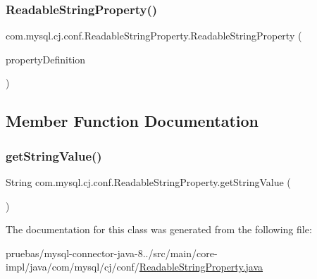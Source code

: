 \subsubsection{\texorpdfstring{Readable\+String\+Property()}{ReadableStringProperty()}}
{\footnotesize\ttfamily com.\+mysql.\+cj.\+conf.\+Readable\+String\+Property.\+Readable\+String\+Property (\begin{DoxyParamCaption}\item[{\mbox{\hyperlink{interfacecom_1_1mysql_1_1cj_1_1conf_1_1_property_definition}{Property\+Definition}}$<$ String $>$}]{property\+Definition }\end{DoxyParamCaption})\hspace{0.3cm}{\ttfamily [protected]}}



\subsection{Member Function Documentation}
\mbox{\label{classcom_1_1mysql_1_1cj_1_1conf_1_1_readable_string_property_a80f31bf0ff94266fcec3d38571797c65}} 
\subsubsection{\texorpdfstring{get\+String\+Value()}{getStringValue()}}
{\footnotesize\ttfamily String com.\+mysql.\+cj.\+conf.\+Readable\+String\+Property.\+get\+String\+Value (\begin{DoxyParamCaption}{ }\end{DoxyParamCaption})}



The documentation for this class was generated from the following file\+:\begin{DoxyCompactItemize}
\item 
pruebas/mysql-\/connector-\/java-\/8../src/main/core-\/impl/java/com/mysql/cj/conf/\mbox{\hyperlink{_readable_string_property_8java}{Readable\+String\+Property.\+java}}\end{DoxyCompactItemize}
